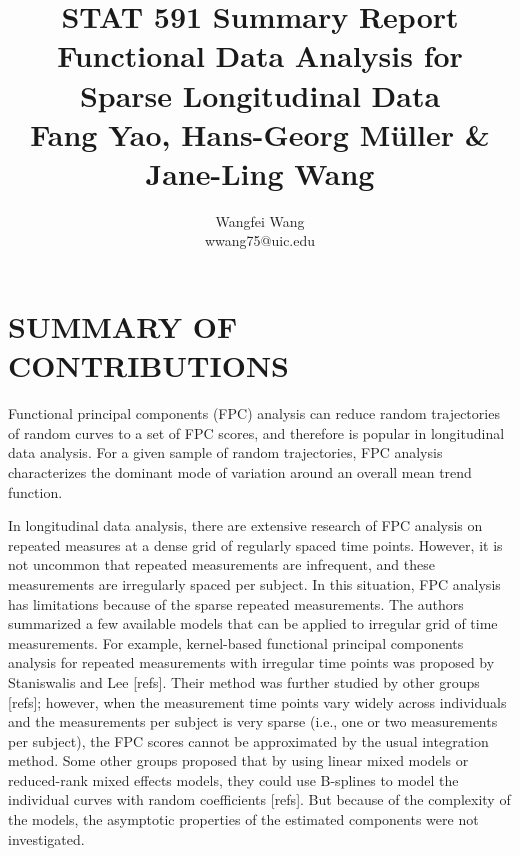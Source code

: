 \documentclass[11pt]{report}
\begin{document}
\title{
  \huge STAT 591 Summary Report \\ 
  \vspace{10mm}
  \large  Functional Data Analysis for Sparse Longitudinal Data\\
  \normalsize Fang Yao, Hans-Georg M\"{u}ller \& Jane-Ling Wang}

\author{Wangfei Wang \\ wwang75@uic.edu }

\graphicspath{{./Figures/}}

\maketitle

\section{SUMMARY OF CONTRIBUTIONS}
Functional principal components (FPC) analysis can reduce random trajectories of random curves to a set of FPC scores, and therefore is popular in longitudinal data analysis. 
For a given sample of random trajectories, FPC analysis characterizes the dominant mode of variation  around an overall mean trend function. 

In longitudinal data analysis, there are extensive research of FPC analysis on repeated measures at a dense grid of regularly spaced time points. 
However, it is not uncommon that repeated measurements are infrequent, and these measurements are irregularly spaced per subject. 
In this situation, FPC analysis has limitations because of the sparse repeated measurements. 
The authors summarized a few available models that can be applied to irregular grid of time measurements. 
For example, kernel-based functional principal components analysis for repeated measurements with irregular time points was proposed by Staniswalis and Lee [refs]. %
Their method was further studied by other groups [refs]; %
however, when the measurement time points vary widely across individuals and the measurements per subject is very sparse (i.e., one or two measurements per subject), the FPC scores cannot be approximated by the usual integration method. 
Some other groups proposed that by using linear mixed models or reduced-rank mixed effects models, they could use B-splines to model the individual curves with random coefficients [refs]. %
But because of the complexity of the models, the asymptotic properties of the estimated components were not investigated. 
\end{document}
